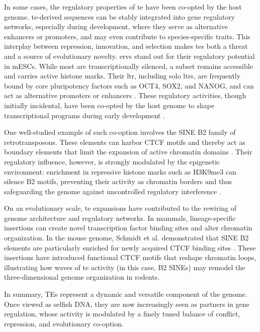 \documentclass[11pt]{book}
\begin{document}
In some cases, the regulatory properties of \gls{te} have been co-opted by the host genome. \Gls{te}-derived sequences can be stably integrated into gene regulatory networks, especially during development, where they serve as alternative enhancers or promoters, and may even contribute to species-specific traits. This interplay between repression, innovation, and selection makes \glspl{te} both a threat and a source of evolutionary novelty. \Glspl{erv} stand out for their regulatory potential in mESCs. While most are transcriptionally silenced, a subset remains accessible and carries active histone marks. Their \gls{ltr}, including solo \glspl{ltr}, are frequently bound by core pluripotency factors such as OCT4, SOX2, and NANOG, and can act as alternative promoters or enhancers \cite{bakoulis_endogenous_2022}. These regulatory activities, though initially incidental, have been co-opted by the host genome to shape transcriptional programs during early development \cite{chuong_regulatory_2017}.

One well-studied example of such co-option involves the SINE B2 family of retrotransposons. These elements can harbor CTCF motifs and thereby act as boundary elements that limit the expansion of active chromatin domains \cite{ichiyanagi_b2_2021}. Their regulatory influence, however, is strongly modulated by the epigenetic environment: enrichment in repressive histone marks such as H3K9me3 can silence B2 motifs, preventing their activity as chromatin borders and thus safeguarding the genome against uncontrolled regulatory interference \cite{gualdrini_h3k9_2022}.

On an evolutionary scale, \gls{te} expansions have contributed to the rewiring of genome architecture and regulatory networks. In mammals, lineage-specific insertions can create novel transcription factor binding sites and alter chromatin organization. In the mouse genome, Schmidt et al. demonstrated that SINE B2 elements are particularly enriched for newly acquired CTCF binding sites \cite{schmidt_waves_2012}. These insertions have introduced functional CTCF motifs that reshape chromatin loops, illustrating how waves of \gls{te} activity (in this case, B2 SINEs) may remodel the three-dimensional genome organization in rodents.

In summary, TEs represent a dynamic and versatile component of the genome. Once viewed as selfish DNA, they are now increasingly seen as partners in gene regulation, whose activity is modulated by a finely tuned balance of conflict, repression, and evolutionary co-option.
\end{document}

